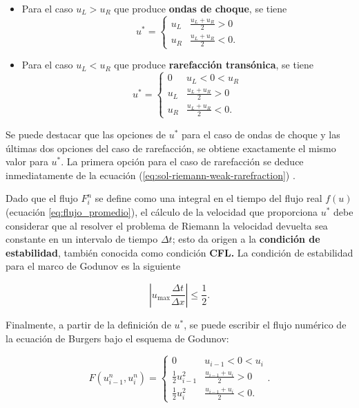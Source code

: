 \documentclass[12pt]{article}
\begin{document}
 	\begin{itemize}
 		\item Para el caso $u_L > u_R$ que produce \textbf{ondas de choque}, se tiene
 		\begin{equation}
 			u^{*} =
 			\begin{cases}
 				u_{L} & \frac{u_L + u_R}{2} > 0 \\
 				u_{R} & \frac{u_L + u_R}{2} < 0.
 			\end{cases}
 		\label{eq:uprima1}
 		\end{equation}
 		\item Para el caso $u_L < u_R$ que produce \textbf{rarefacción transónica}, se tiene
 		\begin{equation}
 			u^{*} =
 			\begin{cases}
 				0 & u_{L} < 0 < u_{R}\\
 				u_{L} & \frac{u_L + u_R}{2} > 0 \\
 				u_{R} & \frac{u_L + u_R}{2} < 0.
 			\end{cases}
 		\label{eq:uprima2}
 		\end{equation}
 	\end{itemize}
 	Se puede destacar que las opciones de $u^{*}$ para el caso de ondas de choque y las últimas dos opciones del caso de rarefacción, se obtiene exactamente el mismo valor para $u^{*}$. La primera opción para el caso de rarefacción se deduce inmediatamente de la ecuación (\ref{eq:sol-riemann-weak-rarefraction}) \cite{pletcher1997computational}.
 	
 	Dado que el flujo $F_{i}^{n}$ se define como una integral en el tiempo del flujo real $f(u)$ (ecuación \ref{eq:flujo_promedio}), el cálculo de la velocidad que proporciona $u^{*}$ debe considerar que al resolver el problema de Riemann la velocidad devuelta sea constante en un intervalo de tiempo $\Delta t$; esto da origen a la \textbf{condición de estabilidad}, también conocida como condición \textbf{CFL.} La condición de estabilidad para el marco de Godunov es la siguiente \cite{pletcher1997computational}
 	
 	\begin{equation}
 		\left| u_{\text{max}} \frac{\Delta t}{\Delta x}\right| \leq \frac{1}{2} .
 	\end{equation}
 	 
 	 Finalmente, a partir de la definición de $u^{*}$, se puede escribir el flujo numérico de la ecuación de Burgers bajo el esquema de Godunov:
  	
  	\begin{equation}
  		\boxed{F(u_{i-1}^{n}, u_{i}^{n}) =
  		\begin{cases}
  			0 & u_{i-1} < 0 < u_{i}\\
  			\frac{1}{2}u_{i-1}^{2} & \frac{u_{i-1} + u_{i}}{2} > 0 \\
  			\frac{1}{2}u_{i}^{2} & \frac{u_{i-1} + u_{i}}{2} < 0.
  		\end{cases}.}
  		\label{eq:flujo-godunov}
  	\end{equation}
 	 
\end{document}
